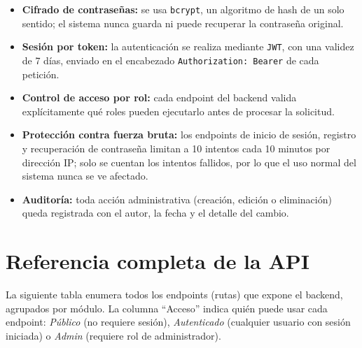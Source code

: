 \documentclass[11pt,a4paper]{article}
\begin{document}
\begin{itemize}
    \item \textbf{Cifrado de contraseñas:} se usa \texttt{bcrypt}, un algoritmo de hash de un solo sentido; el sistema nunca guarda ni puede recuperar la contraseña original.
    \item \textbf{Sesión por token:} la autenticación se realiza mediante \texttt{JWT}, con una validez de 7 días, enviado en el encabezado \texttt{Authorization: Bearer} de cada petición.
    \item \textbf{Control de acceso por rol:} cada endpoint del backend valida explícitamente qué roles pueden ejecutarlo antes de procesar la solicitud.
    \item \textbf{Protección contra fuerza bruta:} los endpoints de inicio de sesión, registro y recuperación de contraseña limitan a 10 intentos cada 10 minutos por dirección IP; solo se cuentan los intentos fallidos, por lo que el uso normal del sistema nunca se ve afectado.
    \item \textbf{Auditoría:} toda acción administrativa (creación, edición o eliminación) queda registrada con el autor, la fecha y el detalle del cambio.
\end{itemize}

\section{Referencia completa de la API}

La siguiente tabla enumera todos los endpoints (rutas) que expone el backend, agrupados por módulo. La columna ``Acceso'' indica quién puede usar cada endpoint: \emph{Público} (no requiere sesión), \emph{Autenticado} (cualquier usuario con sesión iniciada) o \emph{Admin} (requiere rol de administrador).
\end{document}
